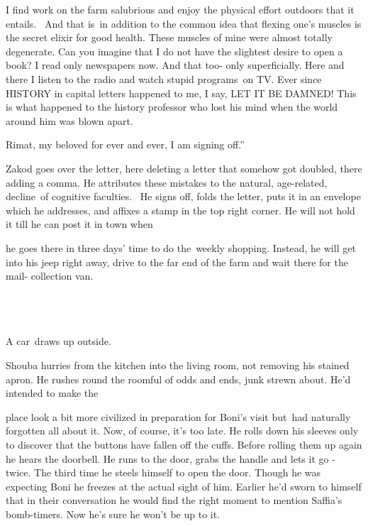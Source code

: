 \documentclass[twoside,11pt]{book}
\begin{document}
I find work on the farm salubrious and enjoy the physical effort outdoors that it entails.~ And that is~in addition to
the common idea that flexing one's muscles is the secret elixir for good health. These muscles of mine were almost
totally degenerate. Can you imagine that I do not have the slightest desire to open a book? I read only newspapers now.
And that too- only superficially. Here and there I listen to the radio and watch stupid programs~on TV. Ever since
HISTORY in capital letters happened to me, I say, LET IT BE DAMNED! This is what happened to the history professor who
lost his mind when the world around him was blown apart.

Rimat, my beloved for ever and ever, I am signing off.''

Zakod goes over the letter, here deleting a letter that somehow got doubled, there adding a comma. He attributes these
mistakes to the natural, age-related, decline~of cognitive faculties. \ He signs off, folds the letter, puts it in an
envelope which he addresses, and affixes a stamp in the top right corner. He will not hold it till he can post it in
town when

he goes there in three days' time to do the~weekly shopping. Instead, he will get into his jeep right away, drive to the
far end of the farm and wait there for the mail- collection van.

~

\chapter{}

A car~draws up outside.{ }

Shouba hurries from the kitchen into the living room, not removing his stained apron. He rushes round the roomful of
odds and ends, junk strewn about. He'd intended to make the

place look a bit more civilized in preparation for Boni's visit but~had naturally forgotten all about it. Now, of
course, it's too late. He rolls down his sleeves only to discover that the buttons have fallen off the cuffs. Before
rolling them up again he hears the doorbell. He runs to the door, grabs the handle and lets it go - twice. The third
time he steels himself to open the door. Though he was expecting Boni he freezes at the actual sight of him. Earlier
he'd sworn to himself that in their conversation he would find the right moment to mention Saffia's bomb-timers. Now
he's sure he won't be up to it.
\end{document}
